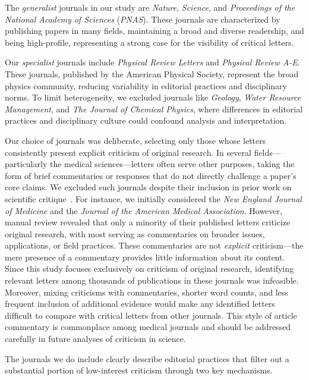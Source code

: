 \documentclass[12pt]{article} %
\begin{document}
The \textit{generalist} journals in our study are \textit{Nature}, \textit{Science}, and \textit{Proceedings of the National Academy of Sciences} (\textit{PNAS}).
These journals are characterized by publishing papers in many fields, maintaining a broad and diverse readership, and being high-profile, representing a strong case for the visibility of critical letters.

Our \textit{specialist} journals include \textit{Physical Review Letters} and \textit{Physical Review A-E}. These journals, published by the American Physical Society, represent the broad physics community, reducing variability in editorial practices and disciplinary norms. 
To limit heterogeneity, we excluded journals like \textit{Geology}, \textit{Water Resource Management}, and \textit{The Journal of Chemical Physics}, where differences in editorial practices and disciplinary culture could confound analysis and interpretation.

Our choice of journals was deliberate, selecting only those whose letters consistently present explicit criticism of original research. In several fields—particularly the medical sciences—letters often serve other purposes, taking the form of brief commentaries or responses that do not directly challenge a paper's core claims. We excluded such journals despite their inclusion in prior work on scientific critique~\cite{radicchi_2012_comment}.
For instance, we initially considered the \textit{New England Journal of Medicine} and the \textit{Journal of the American Medical Association}. However, manual review revealed that only a minority of their published letters criticize original research, with most serving as commentaries on broader issues, applications, or field practices. These commentaries are not \textit{explicit} criticism—the mere presence of a commentary provides little information about its content. Since this study focuses exclusively on criticism of original research, identifying relevant letters among thousands of publications in these journals was infeasible. Moreover, mixing criticisms with commentaries, shorter word counts, and less frequent inclusion of additional evidence would make any identified letters difficult to compare with critical letters from other journals. This style of article commentary is commonplace among medical journals and should be addressed carefully in future analyses of criticism in science.

The journals we do include clearly describe editorial practices that filter out a substantial portion of low-interest criticism through two key mechanisms.
\end{document}

